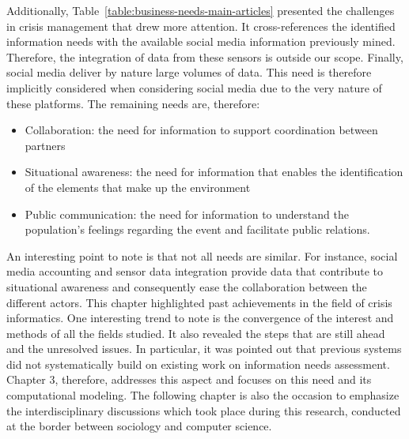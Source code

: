 Additionally, Table~\ref{table:business-needs-main-articles} presented the challenges in crisis management that drew more attention.
It cross-references the identified information needs with the available social media information previously mined.
Therefore, the integration of data from these sensors is outside our scope.
Finally, social media deliver by nature large volumes of data.
This need is therefore implicitly considered when considering social media due to the very nature of these platforms.
The remaining needs are, therefore:

\begin{itemize}
    \item Collaboration: the need for information to support coordination between partners
    \item Situational awareness: the need for information that enables the identification of the elements that make up the environment
    \item Public communication: the need for information to understand the population's feelings regarding the event and facilitate public relations.
\end{itemize}

An interesting point to note is that not all needs are similar.
For instance, social media accounting and sensor data integration provide data that contribute to situational awareness and consequently ease the collaboration between the different actors.
This chapter highlighted past achievements in the field of crisis informatics.
One interesting trend to note is the convergence of the interest and methods of all the fields studied.
It also revealed the steps that are still ahead and the unresolved issues.
In particular, it was pointed out that previous systems did not systematically build on existing work on information needs assessment.
Chapter 3, therefore, addresses this aspect and focuses on this need and its computational modeling.
The following chapter is also the occasion to emphasize the interdisciplinary discussions which took place during this research, conducted at the border between sociology and computer science.


